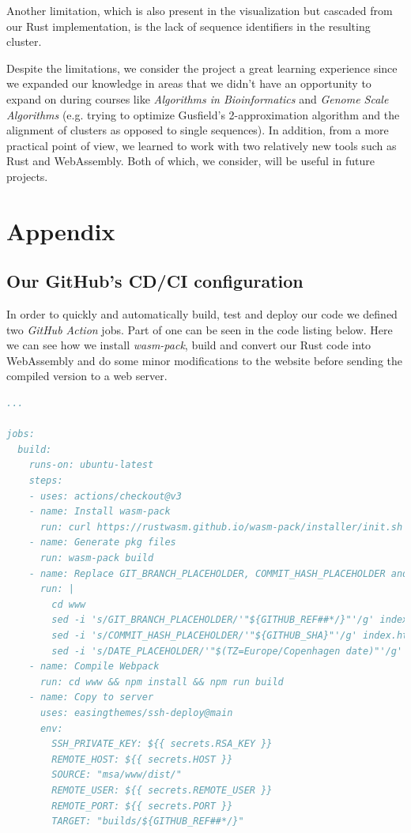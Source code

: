 \documentclass[twoside,openright,titlepage,numbers=noenddot,headinclude,%
                footinclude=true,cleardoublepage=empty,abstractoff, %
                BCOR=5mm,paper=a4,fontsize=11pt,%
                ngerman,american,%
                ]{scrreprt}
\begin{document}
Another limitation, which is also present in the visualization but cascaded from our Rust implementation, is the lack of sequence identifiers in the resulting cluster.

Despite the limitations, we consider the project a great learning experience since we expanded our knowledge in areas that we didn't have an opportunity to expand on during courses like \textit{Algorithms in Bioinformatics} and \textit{Genome Scale Algorithms} (e.g. trying to optimize Gusfield's 2-approximation algorithm and the alignment of clusters as opposed to single sequences). In addition, from a more practical point of view, we learned to work with two relatively new tools such as Rust and WebAssembly. Both of which, we consider, will be useful in future projects.

\appendix
\cleardoublepage

\chapter{Appendix}
\label{cha:an-appendix}

\section{Our GitHub's CD/CI configuration}
\label{sec:github-ci}
In order to quickly and automatically build, test and deploy our code we defined two \textit{GitHub Action} jobs. Part of one can be seen in the code listing below. Here we can see how we install \textit{wasm-pack}, build and convert our Rust code into WebAssembly and do some minor modifications to the website before sending the compiled version to a web server.

\lstset{basicstyle=\ttfamily\scriptsize}
\begin{lstlisting}[language=YAML,numbers=none]
...

jobs:
  build:
    runs-on: ubuntu-latest
    steps:
    - uses: actions/checkout@v3
    - name: Install wasm-pack
      run: curl https://rustwasm.github.io/wasm-pack/installer/init.sh -sSf | sh
    - name: Generate pkg files
      run: wasm-pack build
    - name: Replace GIT_BRANCH_PLACEHOLDER, COMMIT_HASH_PLACEHOLDER and DATE_PLACEHOLDER
      run: |
        cd www
        sed -i 's/GIT_BRANCH_PLACEHOLDER/'"${GITHUB_REF##*/}"'/g' index.html
        sed -i 's/COMMIT_HASH_PLACEHOLDER/'"${GITHUB_SHA}"'/g' index.html
        sed -i 's/DATE_PLACEHOLDER/'"$(TZ=Europe/Copenhagen date)"'/g' index.html
    - name: Compile Webpack
      run: cd www && npm install && npm run build
    - name: Copy to server
      uses: easingthemes/ssh-deploy@main
      env:
        SSH_PRIVATE_KEY: ${{ secrets.RSA_KEY }}
        REMOTE_HOST: ${{ secrets.HOST }}
        SOURCE: "msa/www/dist/"
        REMOTE_USER: ${{ secrets.REMOTE_USER }}
        REMOTE_PORT: ${{ secrets.PORT }}
        TARGET: "builds/${GITHUB_REF##*/}"
\end{lstlisting}
\end{document}

